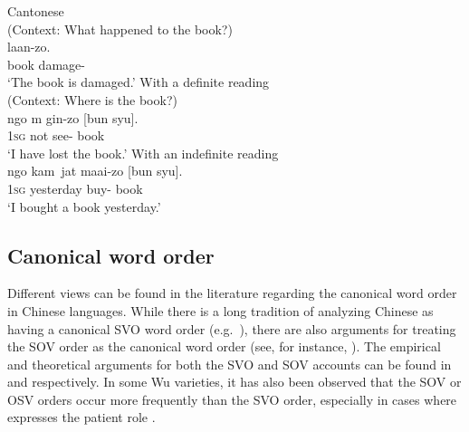 \documentclass[output=paper,chinesefont,hidelinks]{langscibook}
\begin{document}
\ea%
    \label{ex:Sinitic:7} Cantonese
    \\
    (Context: What happened to the book?)\\
      laan-zo.\\
         {\db}{\CLF}  book  damage-\PFV\\
    \glt `The book is damaged.'
    \ea With a definite reading\\
    (Context: Where is the book?)\\
    \gll ngo  m  gin-zo    [bun  syu].\\
         \textsc{1sg}   not  see-{\PFV}   {\db}{\CLF}  book\\
    \glt `I have lost the book.'
    \ex With an indefinite reading\\
    \gll ngo  kam~jat    maai-zo  [bun  syu].\\
        \textsc{1sg}   yesterday  buy-{\PFV}  {\db}{\CLF}  book\\
    \glt`I bought a book yesterday.'
    \z\z\z

\subsection{Canonical word order}
\label{sec:Sinitic:2.3}

Different views can be found in the literature regarding the canonical word order in Chinese languages. While there is a long tradition of analyzing Chinese as having a canonical SVO word order (e.g.\ \citealt{Light1979,Mei1980,SunGivon1985,Dryer2005}), there are also arguments for treating the SOV order as the canonical word order (see, for instance, \citealt{Tai1973,LiThompson1974}). The empirical and theoretical arguments for both the SVO and SOV accounts can be found in \citet{Liu2022} and \citet{XuDong2022} respectively. In some Wu varieties, it has also been observed that the SOV or OSV orders occur more frequently than the SVO order, especially in cases where {\OBJ} expresses the patient role \citep{Yue2003}.
\end{document}

